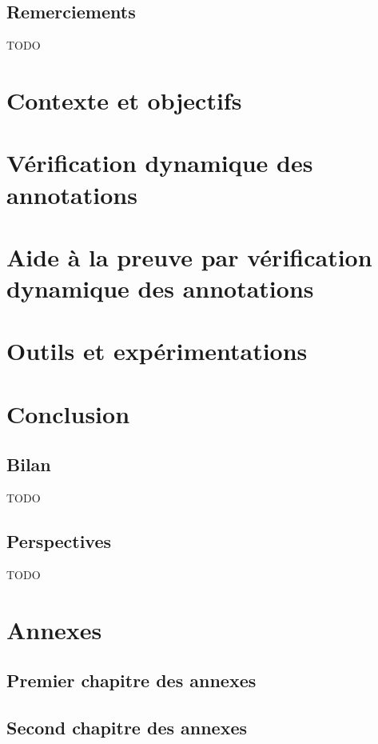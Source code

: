 \documentclass[french]{spimufcphdthesis}
\begin{document}
\chapter*{Remerciements}

TODO


\tableofcontents
\mainmatter


\part{Contexte et objectifs}




\part{Vérification dynamique des annotations}





\part{Aide à la preuve par vérification dynamique des annotations}




\part{Outils et expérimentations}




\part{Conclusion}
\chapter{Bilan}
TODO
\chapter{Perspectives}
TODO


\backmatter




\listoffigures
\listoftables
\listofdefinitions

\appendix
\part{Annexes}

\chapter{Premier chapitre des annexes}
\chapter{Second chapitre des annexes}
\end{document}
